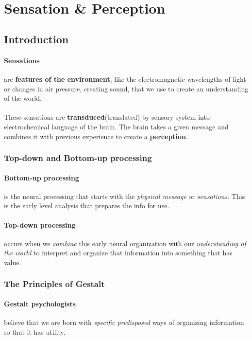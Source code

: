 \documentclass{article}
\begin{document}
	
	
	
	
	
	
	
	
	\section{Sensation \& Perception}
	\subsection{Introduction}
	\paragraph{Sensations} are \textbf{features of the environment}, like the electromagnetic wavelengths of light or changes in air pressure, creating sound, that we use to create an understanding of the world.
	\paragraph{}These sensations are \textbf{transduced}(translated) by sensory system into electrochemical language of the brain. The brain takes a given message and combines it with previous experience to create a \textbf{perception}.
	\subsubsection{Top-down and Bottom-up processing}
	\paragraph{Bottom-up processing} is the neural processing that starts with the \emph{physical message} or \emph{sensations}. This is the early level analysis that prepares the info for use.
	\paragraph{Top-down processing} occurs when we \emph{combine} this early neural organization with our \emph{understanding of the world} to interpret and organize that information into something that has value.
	\subsubsection{The Principles of Gestalt}
	\paragraph{Gestalt psychologists} believe that we are born with \emph{specific predisposed} ways of organizing information so that it has utility.
\end{document}

